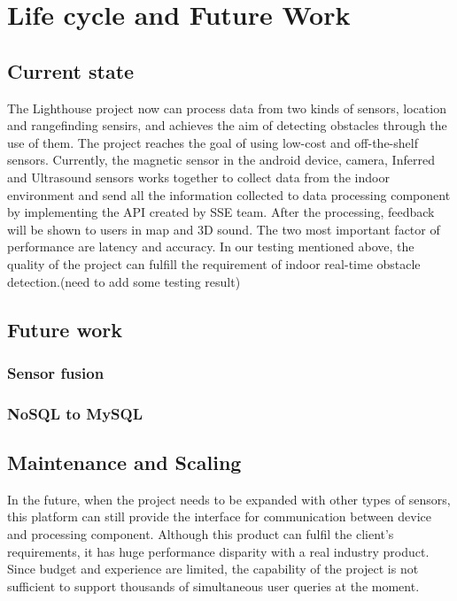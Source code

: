 \documentclass[prodmode,acmtosem]{acmsmall} %
\begin{document}
\section{Life cycle and Future Work}
\subsection{Current state}
The Lighthouse project now can process data from two kinds of sensors, location and rangefinding sensirs, and achieves the aim of detecting obstacles through the use of them. The project reaches the goal of using low-cost and off-the-shelf sensors. Currently, the magnetic sensor in the android device, camera, Inferred and Ultrasound sensors works together to collect data from the indoor environment and send all the information collected to data processing component by implementing the API created by SSE team. After the processing, feedback will be shown to users in map and 3D sound. The two most important factor of performance are latency and accuracy. In our testing mentioned above, the quality of the project can fulfill the requirement of indoor real-time obstacle detection.(need to add some testing result)

\subsection{Future work}

\subsubsection{Sensor fusion}

\subsubsection{NoSQL to MySQL}

\subsection{Maintenance and Scaling}
In the future, when the project needs to be expanded with other types of sensors, this platform can still provide the interface for communication between device and processing component. 
Although this product can fulfil the client's requirements, it has huge performance disparity with a real industry product. Since budget and experience are limited, the capability of the project is not sufficient to support thousands of simultaneous user queries at the moment.
\end{document}
